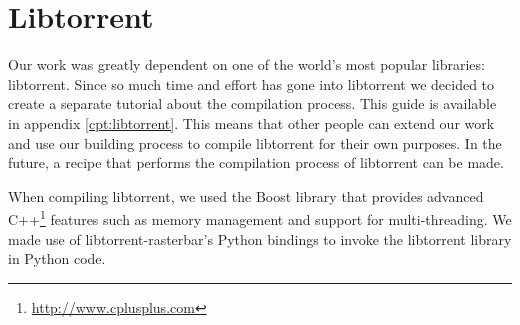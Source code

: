 \section{Libtorrent}
	Our work was greatly dependent on one of the world's most popular libraries: libtorrent. Since so much time and effort has gone into libtorrent  we decided to create a separate tutorial about the compilation process. This guide is available in appendix \ref{cpt:libtorrent}. This means that other people can extend our work and use our building process to compile libtorrent for their own purposes. In the future, a recipe that performs the compilation process of libtorrent can be made.
	
	When compiling libtorrent, we used the Boost library that provides advanced C++\footnote{\url{http://www.cplusplus.com}} features such as memory management and support for multi-threading. We made use of libtorrent-rasterbar's Python bindings to invoke the libtorrent library in Python code.
